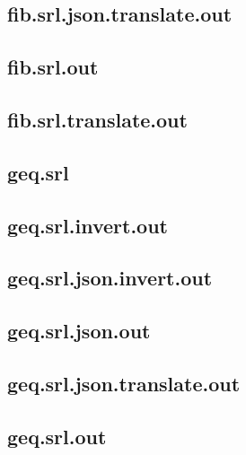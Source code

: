 \subsection{fib.srl.json.translate.out}
\label{app:fib_srl.json.translate.out}

\subsection{fib.srl.out}
\label{app:fib_srl.out}

\subsection{fib.srl.translate.out}
\label{app:fib_srl.translate.out}

\subsection{geq.srl}
\label{app:geq_srl}

\subsection{geq.srl.invert.out}
\label{app:geq_srl.invert.out}

\subsection{geq.srl.json.invert.out}
\label{app:geq_srl.json.invert.out}

\subsection{geq.srl.json.out}
\label{app:geq_srl.json.out}

\subsection{geq.srl.json.translate.out}
\label{app:geq_srl.json.translate.out}

\subsection{geq.srl.out}
\label{app:geq_srl.out}

